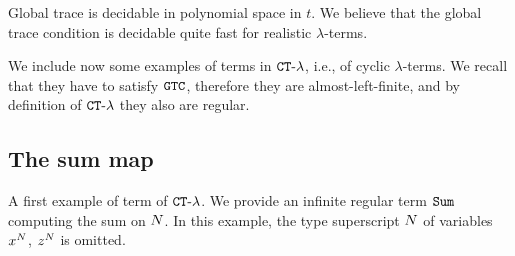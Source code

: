 Global trace is decidable in polynomial space in $t$. 
We believe that the global trace condition is decidable quite fast
for realistic $\lambda$-terms. 


We include now some examples of  terms in ${ {\tt CT}\mbox{-}\lambda}$, i.e., 
of cyclic $\lambda$-terms. We recall that they have to satisfy ${\tt GTC}$, therefore they are almost-left-finite, and by definition of ${ {\tt CT}\mbox{-}\lambda}$ they also are regular.


\subsection{The sum map}

A first example of term of  ${ {\tt CT}\mbox{-}\lambda}$. 
We provide an infinite regular term ${\tt Sum}$ computing the sum on ${N}$.
In this example, the type superscript ${N}$ of variables $x^{N}$, $z^{N}$ is omitted.

